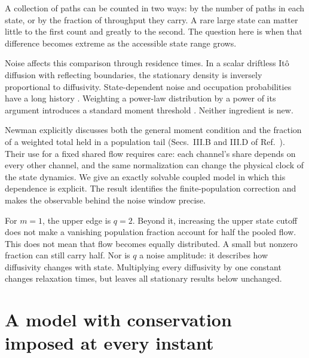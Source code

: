 \documentclass[11pt,a4paper]{article}
\begin{document}
A collection of paths can be counted in two ways: by the number of paths in each
state, or by the fraction of throughput they carry. A rare large state can matter
little to the first count and greatly to the second. The question here is when
that difference becomes extreme as the accessible state range grows.

Noise affects this comparison through residence times. In a scalar driftless
It\^o diffusion with reflecting boundaries, the stationary density is inversely
proportional to diffusivity. State-dependent noise and occupation probabilities
have a long history \cite{landauer,maes}. Weighting a power-law distribution by a
power of its argument introduces a standard moment threshold \cite{newman}.
Neither ingredient is new.

Newman explicitly discusses both the general moment condition and the fraction
of a weighted total held in a population tail (Secs.~III.B and III.D of
Ref.~\cite{newman}). Their use for a fixed shared flow requires care: each channel's share depends on
every other channel, and the same normalization can change the physical clock
of the state dynamics. We give an exactly solvable coupled model in which this
dependence is explicit. The result identifies the finite-population correction
and makes the observable behind the noise window precise.

For $m=1$, the upper edge is $q=2$. Beyond it, increasing the upper state cutoff
does not make a vanishing population fraction account for half the pooled flow.
This does not mean that flow becomes equally distributed. A small but nonzero
fraction can still carry half. Nor is $q$ a noise amplitude: it describes how
diffusivity changes with state. Multiplying every diffusivity by one constant
changes relaxation times, but leaves all stationary results below unchanged.

\section{A model with conservation imposed at every instant}
\end{document}
